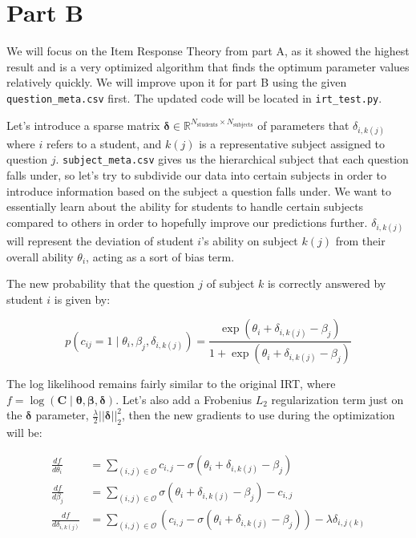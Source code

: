 \documentclass[11pt]{article}
\begin{document}
\section*{Part B}

We will focus on the Item Response Theory from part A, as it showed the highest result and is a very optimized algorithm that finds the optimum parameter values relatively quickly. We will improve upon it for part B using the given \verb|question_meta.csv| first. The updated code will be located in \verb|irt_test.py|.

Let's introduce a sparse matrix $\boldsymbol{\delta} \in \mathbb{R}^{N_{\text{students}} \times N_{\text{subjects}}}$ of parameters that $\delta_{i,k(j)}$ where $i$ refers to a student, and $k(j)$ is a representative subject assigned to question $j$. \verb|subject_meta.csv| gives us the hierarchical subject that each question falls under, so let's try to subdivide our data into certain subjects in order to introduce information based on the subject a question falls under. We want to essentially learn about the ability for students to handle certain subjects compared to others in order to hopefully improve our predictions further. $\delta_{i, k(j)}$ will represent the deviation of student $i$'s ability on subject $k(j)$ from their overall ability $\theta_i$, acting as a sort of bias term.

The new probability that the question $j$ of subject $k$ is correctly answered by student $i$ is given by:

\[
p(c_{ij} = 1 \mid \theta_i, \beta_j, \delta_{i, k(j)})
= 
\frac{\exp(\theta_i + \delta_{i,k(j)} - \beta_j)}{1+\exp(\theta_i + \delta_{i,k(j)} - \beta_j)}
\]

The log likelihood remains fairly similar to the original IRT, where $f = \log(\mathbf{C} \mid \boldsymbol{\theta}, \boldsymbol{\beta}, \boldsymbol{\delta})$. Let's also add a Frobenius $L_2$ regularization term just on the $\boldsymbol{\delta}$ parameter, $\frac{\lambda}{2}||\boldsymbol{\delta}||^2_2$, then the new gradients to use during the optimization will be:

\begin{align*}
\frac{df}{d\theta_i} &= \sum_{(i, j) \in \mathcal{O}} c_{i,j} - \sigma(\theta_i + \delta_{i, k(j)} - \beta_{j}) \\
\frac{df}{d\beta_{j}} &= \sum_{(i, j) \in \mathcal{O}}{\sigma(\theta_i + \delta_{i, k(j)} - \beta_{j})} - c_{i,j} \\
\frac{df}{d\delta_{i, k(j)}} &= \sum_{(i, j) \in \mathcal{O}}{(c_{i, j}-\sigma(\theta_i + \delta_{i, k(j)} - \beta_{j}))} -\lambda\delta_{i, j(k)} 
\end{align*}
\end{document}
